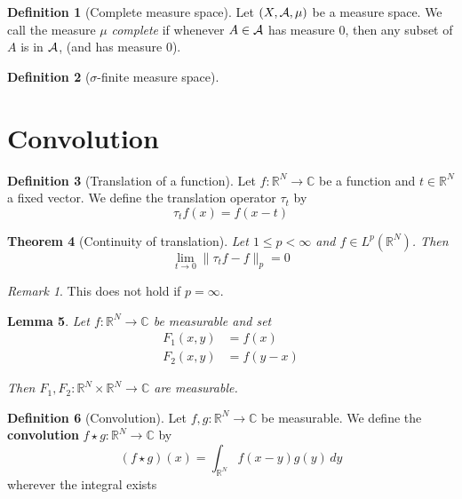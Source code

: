 \documentclass[10pt, oneside, reqno]{amsart}
\theoremstyle{plain}%
\newtheorem{thm}{Theorem}[section]
\newtheorem{lem}[thm]{Lemma}
\theoremstyle{definition}
\newtheorem{defn}[thm]{Definition}
\theoremstyle{remark}
\newtheorem*{rem}{Remark}
\newcommand{\R}{\mathbb{R}}
\newcommand{\C}{\mathbb{C}}
\begin{document}
\begin{defn}[Complete measure space]
	Let $(X,\mathcal{A}, \mu)$ be a measure space.  We call the measure $\mu$ \emph{complete} if whenever $A \in \mathcal{A}$ has measure $0$, then any subset of $A$ is in $\mathcal{A}$, (and has measure 0).
\end{defn}
\begin{defn}[$\sigma$-finite measure space]
	
\end{defn}









\section{Convolution} %
\label{sec:convolution}


\begin{defn}[Translation of a function]
 	Let $f: \R^N \rightarrow \C$ be a function and $t \in \R^N$ a fixed vector. We define the translation operator $\tau_t$ by \[
 		\tau_t f(x) = f(x-t)
 	\]
\end{defn}

\begin{thm}[Continuity of translation]
	Let $1 \leq p < \infty$ and $f \in L^p(\R^N)$.  Then \[
		\lim_{t \rightarrow 0} \| \tau_t f - f \|_p = 0
	\]
\end{thm}
\begin{rem}
	This does not hold if $p = \infty$.
\end{rem}

\begin{lem}
	Let $f : \R^N \rightarrow \C$ be measurable and set 
	\begin{align*}
		F_1(x,y) &= f(x) \\
		F_2(x,y) &= f(y-x)
	\end{align*}
	
	Then $F_1, F_2 : \R^N \times \R^N \rightarrow \C$ are measurable.
\end{lem}

\begin{defn}[Convolution]
	Let $f,g : \R^N \rightarrow \C$ be measurable.  We define the \textbf{convolution} $f \star g : \R^N \rightarrow \C$ by \[
		(f \star g) (x) = \int_{\R^N} f(x-y) g(y) \, dy
	\]
	wherever the integral exists
\end{defn}
\end{document}
